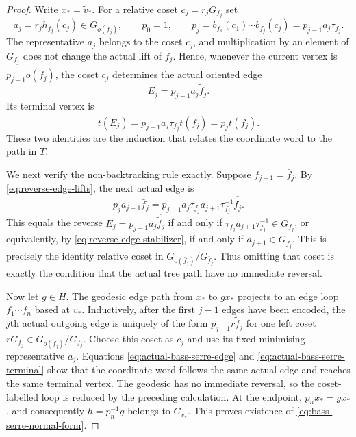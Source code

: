 \documentclass[10pt,a4paper]{amsart}
\begin{document}
\begin{proof}
Write $x_*=\widetilde v_*$.  For a relative coset
$c_j=r_jG_{f_j}$ set
\[
 a_j=r_jh_{f_j}(c_j)\in G_{o(f_j)},
 \qquad
 p_0=1,
 \qquad
 p_j=b_{f_1}(c_1)\cdots b_{f_j}(c_j)
      =p_{j-1}a_j\tau_{f_j}.
\]
The representative $a_j$ belongs to the coset $c_j$, and multiplication by an element of
$G_{f_j}$ does not change the actual lift of $f_j$.  Hence, whenever the current vertex is
$p_{j-1}\widetilde{o(f_j)}$, the coset $c_j$ determines the actual oriented edge
\begin{equation}\label{eq:actual-bass-serre-edge}
 E_j=p_{j-1}a_j\widetilde f_j.
\end{equation}
Its terminal vertex is
\begin{equation}\label{eq:actual-bass-serre-terminal}
 t(E_j)=p_{j-1}a_j\tau_{f_j}\widetilde{t(f_j)}
       =p_j\widetilde{t(f_j)}.
\end{equation}
These two identities are the induction that relates the coordinate word to the path in $T$.

We next verify the non-backtracking rule exactly.  Suppose
$f_{j+1}=\bar f_j$.  By \eqref{eq:reverse-edge-lifts}, the next actual edge is
\[
 p_j a_{j+1}\widetilde{\bar f_j}
 =p_{j-1}a_j\tau_{f_j}a_{j+1}\tau_{f_j}^{-1}
   \overline{\widetilde f_j}.
\]
This equals the reverse
$\overline{E_j}=p_{j-1}a_j\overline{\widetilde f_j}$ if and only if
$\tau_{f_j}a_{j+1}\tau_{f_j}^{-1}\in G_{f_j}$, or equivalently, by
\eqref{eq:reverse-edge-stabilizer}, if and only if
$a_{j+1}\in G_{\bar f_j}$.  This is precisely the identity relative coset in
$G_{o(\bar f_j)}/G_{\bar f_j}$.  Thus omitting that coset is exactly the condition that the
actual tree path have no immediate reversal.

Now let $g\in H$.  The geodesic edge path from $x_*$ to $gx_*$ projects to an edge loop
$f_1\cdots f_n$ based at $v_*$.  Inductively, after the first $j-1$ edges have been encoded,
the $j$th actual outgoing edge is uniquely of the form
$p_{j-1}r\widetilde f_j$ for one left coset
$rG_{f_j}\in G_{o(f_j)}/G_{f_j}$.  Choose this coset as $c_j$ and use its fixed minimising
representative $a_j$. Equations \eqref{eq:actual-bass-serre-edge} and
\eqref{eq:actual-bass-serre-terminal} show that the coordinate word follows the same actual
edge and reaches the same terminal vertex.  The geodesic has no immediate reversal, so the
coset-labelled loop is reduced by the preceding calculation.  At the endpoint,
$p_nx_*=gx_*$, and consequently
$h=p_n^{-1}g$ belongs to $G_{v_*}$.  This proves existence of
\eqref{eq:bass-serre-normal-form}.


\end{proof}
\end{document}
